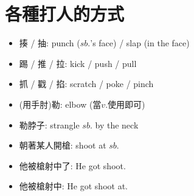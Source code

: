 \section{各種打人的方式}
\begin{multicols}{2}
\begin{itemize}
  \itemsep0em
  \item 揍 / 抽: punch ($sb.$'s face) / slap (in the face)
  \item 踢 / 推 / 拉: kick / push / pull
  \item 抓 / 戳 / 掐: scratch / poke / pinch
  \item (用手肘)勒: elbow (當$v.$使用即可)
  \item 勒脖子: strangle $sb.$ by the neck
  \item 朝著某人開槍: shoot at $sb.$
  \item 他被槍射中了: He got shoot.
  \item 他被槍射中: He got shoot at.
\end{itemize}
\end{multicols}